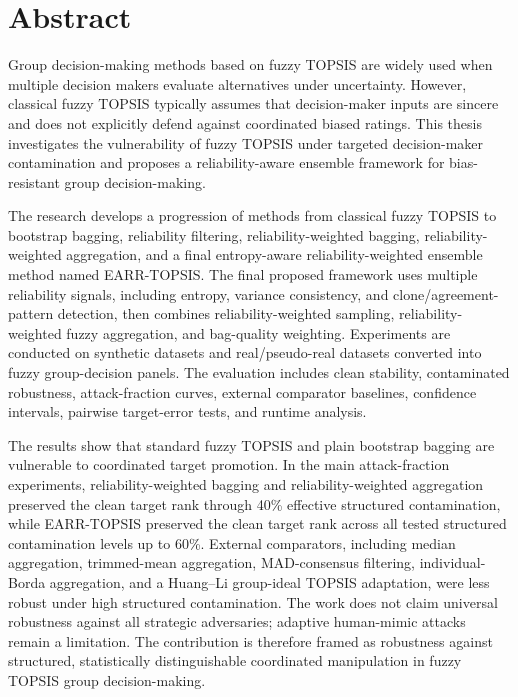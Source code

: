 \documentclass[12pt,a4paper,oneside]{report}
\newcommand{\methodname}{EARR-TOPSIS}
\begin{document}
\chapter*{Abstract}
Group decision-making methods based on fuzzy TOPSIS are widely used when multiple decision makers evaluate alternatives under uncertainty. However, classical fuzzy TOPSIS typically assumes that decision-maker inputs are sincere and does not explicitly defend against coordinated biased ratings. This thesis investigates the vulnerability of fuzzy TOPSIS under targeted decision-maker contamination and proposes a reliability-aware ensemble framework for bias-resistant group decision-making.

The research develops a progression of methods from classical fuzzy TOPSIS to bootstrap bagging, reliability filtering, reliability-weighted bagging, reliability-weighted aggregation, and a final entropy-aware reliability-weighted ensemble method named \methodname. The final proposed framework uses multiple reliability signals, including entropy, variance consistency, and clone/agreement-pattern detection, then combines reliability-weighted sampling, reliability-weighted fuzzy aggregation, and bag-quality weighting. Experiments are conducted on synthetic datasets and real/pseudo-real datasets converted into fuzzy group-decision panels. The evaluation includes clean stability, contaminated robustness, attack-fraction curves, external comparator baselines, confidence intervals, pairwise target-error tests, and runtime analysis.

The results show that standard fuzzy TOPSIS and plain bootstrap bagging are vulnerable to coordinated target promotion. In the main attack-fraction experiments, reliability-weighted bagging and reliability-weighted aggregation preserved the clean target rank through 40\% effective structured contamination, while \methodname{} preserved the clean target rank across all tested structured contamination levels up to 60\%. External comparators, including median aggregation, trimmed-mean aggregation, MAD-consensus filtering, individual-Borda aggregation, and a Huang--Li group-ideal TOPSIS adaptation, were less robust under high structured contamination. The work does not claim universal robustness against all strategic adversaries; adaptive human-mimic attacks remain a limitation. The contribution is therefore framed as robustness against structured, statistically distinguishable coordinated manipulation in fuzzy TOPSIS group decision-making.

\tableofcontents
\listoftables
\listoffigures

\clearpage
{}









\appendix




\end{document}
